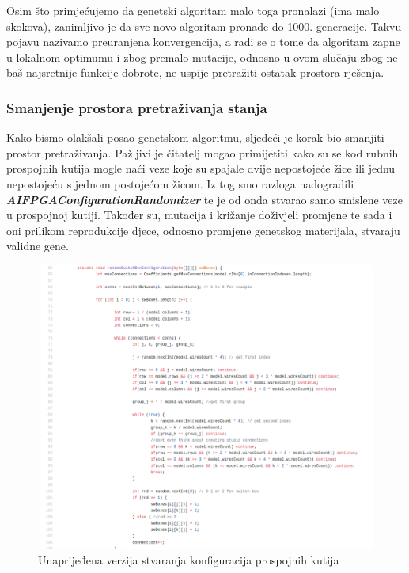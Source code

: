 \documentclass[times, utf8, zavrsni]{fer}
\begin{document}
	Osim što primjećujemo da genetski algoritam malo toga pronalazi (ima malo skokova), zanimljivo je da sve novo algoritam pronađe do 1000. generacije. Takvu pojavu nazivamo preuranjena konvergencija, a radi se o tome da algoritam zapne u lokalnom optimumu i zbog premalo mutacije, odnosno u ovom slučaju zbog ne baš najsretnije funkcije dobrote, ne uspije pretražiti ostatak prostora rješenja. 
	
	\subsubsection{Smanjenje prostora pretraživanja stanja}
	
	Kako bismo olakšali posao genetskom algoritmu, sljedeći je korak bio smanjiti prostor pretraživanja. Pažljivi je čitatelj mogao primijetiti kako su se kod rubnih prospojnih kutija mogle naći veze koje su spajale dvije nepostojeće žice ili jednu nepostojeću s jednom postojećom žicom. Iz tog smo razloga nadogradili \textbf{\emph{AIFPGAConfigurationRandomizer}} te je od onda stvarao samo smislene veze u prospojnoj kutiji. Također su, mutacija i križanje doživjeli promjene te sada i oni prilikom reprodukcije djece, odnosno promjene genetskog materijala, stvaraju validne gene. 
	
	
	\begin{figure}[!htb]
		\centering
		\includegraphics[width=18cm]{slike/noviRandomizer.png}
		\caption{Unaprijeđena verzija stvaranja konfiguracija prospojnih kutija}
		\label{fig:novi-random}
	\end{figure} 
	
\end{document}
